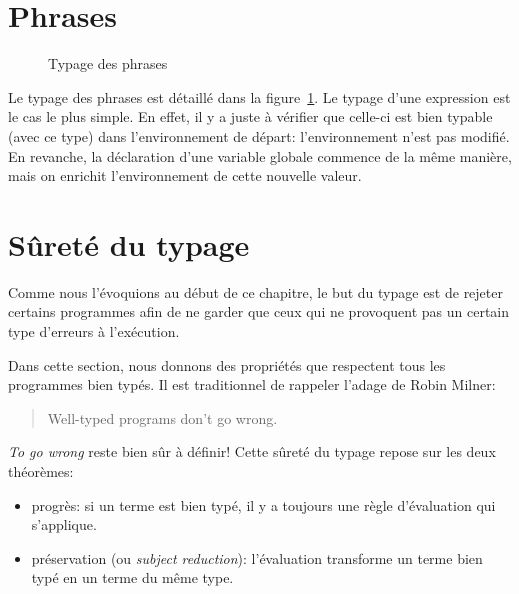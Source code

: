 \section{Phrases}

\begin{figure}


  \begin{mathpar}

  \end{mathpar}

  \caption{Typage des phrases}
\label{fig:typ-ph}

\end{figure}

Le typage des phrases est détaillé dans la figure~\ref{fig:typ-ph}. Le typage
d'une expression est le cas le plus simple. En effet, il y a juste à vérifier
que celle-ci est bien typable (avec ce type) dans l'environnement de départ:
l'environnement n'est pas modifié. En revanche, la déclaration d'une variable
globale commence de la même manière, mais on enrichit l'environnement de cette
nouvelle valeur.

\section{Sûreté du typage}

Comme nous l'évoquions au début de ce chapitre, le but du typage est de rejeter
certains programmes afin de ne garder que ceux qui ne provoquent pas un certain
type d'erreurs à l'exécution.

Dans cette section, nous donnons des propriétés que respectent tous les
programmes bien typés. Il est traditionnel de rappeler l'adage de Robin Milner:

\begin{quote}
  Well-typed programs don't go wrong.
\end{quote}

\emph{To go wrong} reste bien sûr à définir! Cette sûreté du typage repose sur
les deux théorèmes:

\begin{itemize}
\item progrès:
  si un terme est bien typé, il y a toujours une règle
  d'évaluation qui s'applique.
\item
  préservation (ou \emph{subject reduction}):
  l'évaluation transforme un terme bien typé en un terme du même type.
\end{itemize}

